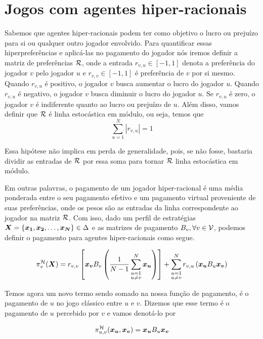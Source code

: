\chapter{Jogos com agentes hiper-racionais}

Sabemos que agentes hiper-racionais podem ter como objetivo o lucro ou prejuízo para si ou qualquer outro jogador envolvido. Para quantificar essas hiperpreferências e aplicá-las no pagamento do jogador nós iremos definir a matriz de preferências $\mathcal{R}$, onde a entrada $r_{v,u}\in[-1,1]$ denota a preferência do jogador $v$ pelo jogador $u$ e $r_{v,v}\in[-1,1]$ é preferência de $v$ por si mesmo. Quando $r_{v,u}$ é positivo, o jogador $v$ busca aumentar o lucro do jogador $u$. Quando $r_{v,u}$ é negativo, o jogador $v$ busca diminuir o lucro do jogador $u$. Se $r_{v,u}$ é zero, o jogador $v$ é indiferente quanto ao lucro ou prejuízo de $u$. Além disso, vamos definir que $\mathcal{R}$ é linha estocástica em módulo, ou seja, temos que
\begin{equation}
    \sum_{u=1}^N |r_{v,u}| = 1
\end{equation}

Essa hipótese não implica em perda de generalidade, pois, se não fosse, bastaria dividir as entradas de $\mathcal{R}$ por essa soma para tornar $\mathcal{R}$ linha estocástica em módulo.

Em outras palavras, o pagamento de um jogador hiper-racional é uma média ponderada entre o seu pagamento efetivo e um pagamento virtual proveniente de suas preferências, onde os pesos são as entradas da linha correspondente ao jogador na matriz $\mathcal{R}$. Com isso, dado um perfil de estratégias $\boldsymbol{X}=\{\boldsymbol{x_1},\boldsymbol{x_2},\dots,\boldsymbol{x_N}\}\in\Delta$ e as matrizes de pagamento $B_v,\forall v\in\mathcal{V}$, podemos definir o pagamento para agentes hiper-racionais como segue.

\begin{equation}
    \label{defPgtoHR}
    \pi^{\mathcal{H}}_v(\boldsymbol{X})=r_{v,v}\left[\boldsymbol{x_v} B_v \left(\frac{1}{N-1}\sum_{\substack{u=1\\u\neq v}}^N \boldsymbol{x_u}\right)\right] + \sum_{\substack{u=1\\u\neq v}}^N r_{v,u} \left(\boldsymbol{x_u} B_u \boldsymbol{x_v}\right)
\end{equation}

Temos agora um novo termo sendo somado na nossa função de pagamento, é o pagamento de $u$ no jogo clássico entre $u$ e $v$. Dizemos que esse termo é o pagamento de $u$ percebido por $v$ e vamos denotá-lo por

\begin{equation}
    \label{defPgtoPercebido}
    \pi^{\mathcal{H}}_{u,v}(\boldsymbol{x_u},\boldsymbol{x_v}) = \boldsymbol{x_u} B_u \boldsymbol{x_v}
\end{equation}

